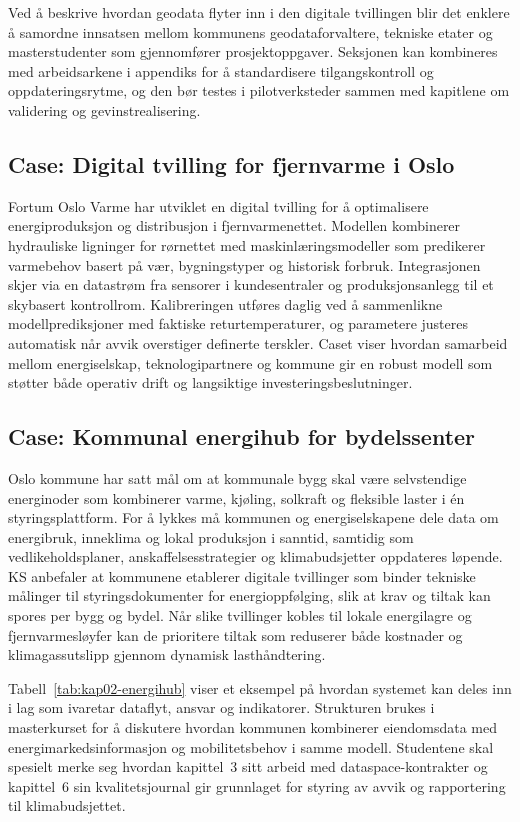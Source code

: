 Ved å beskrive hvordan geodata flyter inn i den digitale tvillingen blir det enklere å samordne innsatsen mellom kommunens geodataforvaltere, tekniske etater og masterstudenter som gjennomfører prosjektoppgaver. Seksjonen kan kombineres med arbeidsarkene i appendiks for å standardisere tilgangskontroll og oppdateringsrytme, og den bør testes i pilotverksteder sammen med kapitlene om validering og gevinstrealisering.

\subsection{Case: Digital tvilling for fjernvarme i Oslo}
Fortum Oslo Varme har utviklet en digital tvilling for å optimalisere energiproduksjon og distribusjon i fjernvarmenettet.
Modellen kombinerer hydrauliske ligninger for rørnettet med maskinlæringsmodeller som predikerer varmebehov basert på vær,
bygningstyper og historisk forbruk. Integrasjonen skjer via en datastrøm fra sensorer i kundesentraler og produksjonsanlegg til
et skybasert kontrollrom. Kalibreringen utføres daglig ved å sammenlikne modellprediksjoner med faktiske returtemperaturer, og
parametere justeres automatisk når avvik overstiger definerte terskler. Caset viser hvordan samarbeid mellom energiselskap,
teknologipartnere og kommune gir en robust modell som støtter både operativ drift og langsiktige investeringsbeslutninger.

\subsection{Case: Kommunal energihub for bydelssenter}
Oslo kommune har satt mål om at kommunale bygg skal være selvstendige energinoder som kombinerer varme, kjøling, solkraft og
fleksible laster i én styringsplattform.\citep{osloeiendom2023strategi,oslo2024klimaeiendom} For å lykkes må kommunen og
energiselskapene dele data om energibruk, inneklima og lokal produksjon i sanntid, samtidig som vedlikeholdsplaner,
anskaffelsesstrategier og klimabudsjetter oppdateres løpende. KS anbefaler at kommunene etablerer digitale tvillinger som
binder tekniske målinger til styringsdokumenter for energioppfølging, slik at krav og tiltak kan spores per bygg og bydel.
\citep{ks2024eiendomsdrift} Når slike tvillinger kobles til lokale energilagre og fjernvarmesløyfer kan de prioritere tiltak som
reduserer både kostnader og klimagassutslipp gjennom dynamisk lasthåndtering.\citep{norskfjernvarme2024fleksibilitet}

Tabell~\ref{tab:kap02-energihub} viser et eksempel på hvordan systemet kan deles inn i lag som ivaretar dataflyt, ansvar og
indikatorer. Strukturen brukes i masterkurset for å diskutere hvordan kommunen kombinerer eiendomsdata med energimarkedsinformasjon
og mobilitetsbehov i samme modell. Studentene skal spesielt merke seg hvordan kapittel~3 sitt arbeid med dataspace-kontrakter og
kapittel~6 sin kvalitetsjournal gir grunnlaget for styring av avvik og rapportering til klimabudsjettet.

